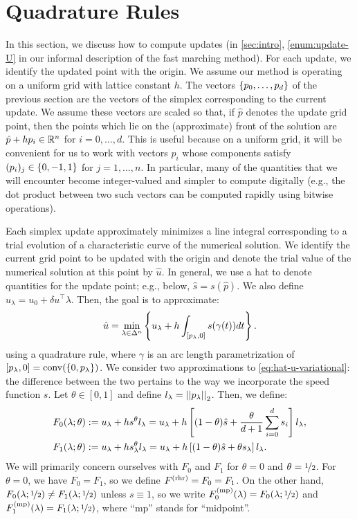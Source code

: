 \documentclass[eikonal.tex]{subfiles}
\begin{document}
\section{Quadrature Rules}

In this section, we discuss how to compute updates (in
\cref{sec:intro}, \cref{enum:update-U} in our informal description of
the fast marching method). For each update, we identify the updated
point with the origin. We assume our method is operating on a uniform
grid with lattice constant $h$. The vectors $\left\{p_0, \hdots, p_d\right\}$
of the previous section are the vectors of the simplex corresponding
to the current update. We assume these vectors are scaled so that, if
$\hat{p}$ denotes the update grid point, then the points which lie on
the (approximate) front of the solution are $\hat{p} + h p_i \in \mathbb{R}^n$
for $i = 0, \hdots, d$. This is useful because on a uniform grid, it
will be convenient for us to work with vectors $p_i$ whose components
satisfy $(p_i)_j \in \left\{0, -1, 1\right\}$ for $j = 1, \hdots, n$. In
particular, many of the quantities that we will encounter become
integer-valued and simpler to compute digitally (e.g., the dot product
between two such vectors can be computed rapidly using bitwise
operations).

Each simplex update approximately minimizes a line integral
corresponding to a trial evolution of a characteristic curve of the
numerical solution. We identify the current grid point to be updated
with the origin and denote the trial value of the numerical solution
at this point by $\hat{u}$. In general, we use a hat to denote
quantities for the update point; e.g., below, $\hat{s} =
s(\hat{p})$. We also define $u_\lambda = u_0 + \delta u^\top
\lambda$. Then, the goal is to approximate:
\begin{align}\label{eq:hat-u-variational}
  \hat{u} = \min_{\lambda \in \Delta^n} \left\{u_\lambda + h \int_{[p_\lambda, 0]} s(\gamma(t))dt\right\}.
\end{align}
using a quadrature rule, where $\gamma$ is an arc length
parametrization of
$[p_\lambda, 0] = \operatorname{conv}(\left\{0, p_\lambda\right\})$. We
consider two approximations to \cref{eq:hat-u-variational}: the
difference between the two pertains to the way we incorporate the
speed function $s$. Let $\theta \in [0, 1]$ and define
$l_\lambda = \left|\left|p_\lambda\right|\right|_2$. Then, we define:
\begin{align*}
  F_0(\lambda; \theta) &:= u_\lambda + h s^{\theta} l_\lambda = u_\lambda + h \left[(1-\theta)\hat{s} + \frac{\theta}{d + 1} \sum_{i=0}^d s_i\right] l_\lambda, \\
  F_1(\lambda; \theta) &:= u_\lambda + h s^{\theta}_\lambda l_\lambda = u_\lambda + h \left[(1-\theta)\hat{s} + \theta s_\lambda\right] l_\lambda.
\end{align*}
We will primarily concern ourselves with $F_0$ and $F_1$ for
$\theta = 0$ and $\theta = \nicefrac{1}{2}$. For $\theta = 0$, we have
$F_0 = F_1$, so we define $F^{\operatorname{(rhr)}} = F_0 = F_1$. On the other hand,
$F_0(\lambda;\nicefrac{1}{2}) \neq F_1(\lambda;\nicefrac{1}{2})$
unless $s \equiv 1$, so we write
$F_0^{\operatorname{(mp)}}(\lambda) = F_0(\lambda; \nicefrac{1}{2})$ and
$F_1^{\operatorname{(mp)}}(\lambda) = F_1(\lambda; \nicefrac{1}{2})$, where ``mp''
stands for ``midpoint''.
\end{document}
